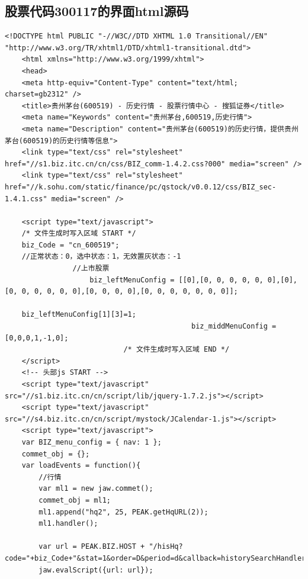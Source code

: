 \documentclass[UTF8,12pt]{article}
\begin{document}
\subsection{股票代码300117的界面html源码}
\begin{lstlisting}[title=股票代码300117的界面html源码,frame=shadowbox]
    <!DOCTYPE html PUBLIC "-//W3C//DTD XHTML 1.0 Transitional//EN" "http://www.w3.org/TR/xhtml1/DTD/xhtml1-transitional.dtd">
    <html xmlns="http://www.w3.org/1999/xhtml">
    <head>
    <meta http-equiv="Content-Type" content="text/html; charset=gb2312" />
    <title>贵州茅台(600519) - 历史行情 - 股票行情中心 - 搜狐证券</title>
    <meta name="Keywords" content="贵州茅台,600519,历史行情">
    <meta name="Description" content="贵州茅台(600519)的历史行情，提供贵州茅台(600519)的历史行情等信息">
    <link type="text/css" rel="stylesheet" href="//s1.biz.itc.cn/cn/css/BIZ_comm-1.4.2.css?000" media="screen" />
    <link type="text/css" rel="stylesheet" href="//k.sohu.com/static/finance/pc/qstock/v0.0.12/css/BIZ_sec-1.4.1.css" media="screen" />
    
    <script type="text/javascript">
    /* 文件生成时写入区域 START */
    biz_Code = "cn_600519";
    //正常状态：0，选中状态：1，无效置灰状态：-1
                //上市股票
                    biz_leftMenuConfig = [[0],[0, 0, 0, 0, 0, 0],[0],[0, 0, 0, 0, 0, 0],[0, 0, 0, 0],[0, 0, 0, 0, 0, 0, 0]];
        
    biz_leftMenuConfig[1][3]=1;
                                            biz_middMenuConfig = [0,0,0,1,-1,0];
                            /* 文件生成时写入区域 END */
    </script>
    <!-- 头部js START -->
    <script type="text/javascript" src="//s1.biz.itc.cn/cn/script/lib/jquery-1.7.2.js"></script> 
    <script type="text/javascript" src="//s4.biz.itc.cn/cn/script/mystock/JCalendar-1.js"></script>
    <script type="text/javascript">
    var BIZ_menu_config = { nav: 1 };
    commet_obj = {};
    var loadEvents = function(){
        //行情
        var ml1 = new jaw.commet();
        commet_obj = ml1;
        ml1.append("hq2", 25, PEAK.getHqURL(2));
        ml1.handler();
        
        var url = PEAK.BIZ.HOST + "/hisHq?code="+biz_Code+"&stat=1&order=D&period=d&callback=historySearchHandler&rt=jsonp";
        jaw.evalScript({url: url});
    

\end{lstlisting}
\end{document}
